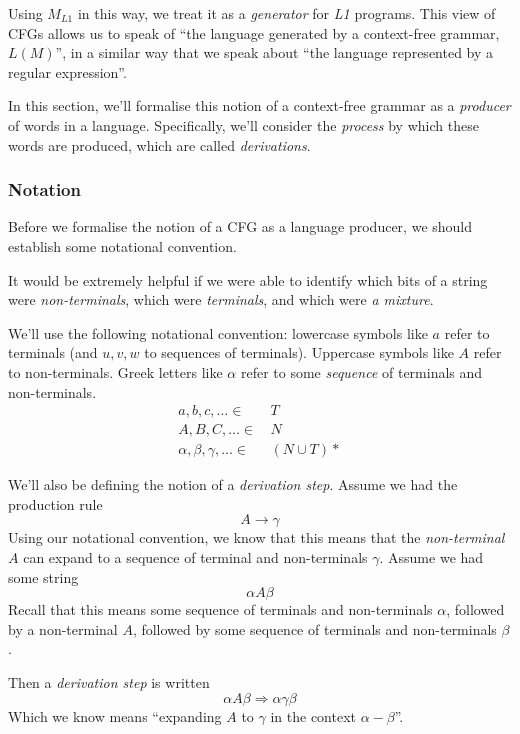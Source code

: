 Using $M_\textit{L1}$ in this way, we treat it as a \textit{generator} for \textit{L1} programs. This view of CFGs allows us to speak of ``the language generated by a context-free grammar, $L(M)$'', in a similar way that we speak about ``the language represented by a regular expression''.

In this section, we'll formalise this notion of a context-free grammar as a \textit{producer} of words in a language. Specifically, we'll consider the \textit{process} by which these words are produced, which are called \textit{derivations}.

\subsubsection{Notation}
Before we formalise the notion of a CFG as a language producer, we should establish some notational convention. 

It would be extremely helpful if we were able to identify which bits of a string were \textit{non-terminals}, which were \textit{terminals}, and which were \textit{a mixture}. 

We'll use the following notational convention: lowercase symbols like $a$ refer to terminals (and $u, v, w$ to sequences of terminals). Uppercase symbols like $A$ refer to non-terminals. Greek letters like $\alpha$ refer to some \textit{sequence} of terminals and non-terminals.
\begin{align*}
    a, b, c, \ldots \in & \, T \\
    A, B, C, \ldots \in & \, N \\
    \alpha, \beta, \gamma, \ldots \in & \, (N \cup T)*
\end{align*}

We'll also be defining the notion of a \textit{derivation step}.  Assume we had the production rule 
\[A \rightarrow \gamma\]
Using our notational convention, we know that this means that the \textit{non-terminal} $A$ can expand to a sequence of terminal and non-terminals $\gamma$. Assume we had some string
\[\alpha A \beta \]
Recall that this means some sequence of terminals and non-terminals $\alpha$, followed by a non-terminal $A$, followed by some sequence of terminals and non-terminals $\beta$. 

Then a \textit{derivation step} is written
\[\alpha A \beta \Rightarrow \alpha \gamma \beta \]
Which we know means ``expanding $A$ to $\gamma$ in the context $\alpha - \beta$''.



